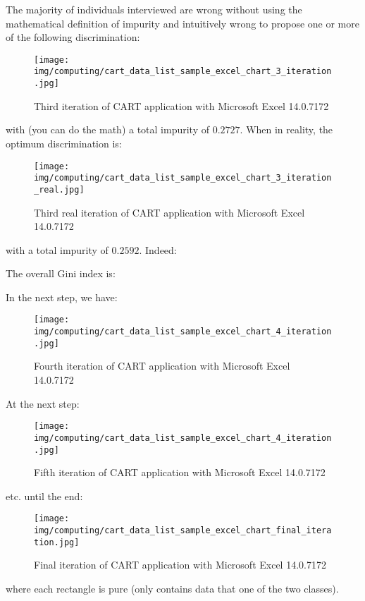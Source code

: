 	The majority of individuals interviewed are wrong without using the mathematical definition of impurity and intuitively wrong to propose one or more of the following discrimination:
	\begin{figure}[H]
		\centering
		\texttt{[image: img/computing/cart\_data\_list\_sample\_excel\_chart\_3\_iteration.jpg]}
		\caption[]{Third iteration of CART application with Microsoft Excel 14.0.7172}
	\end{figure}
	with (you can do the math) a total impurity of $0.2727$. When in reality, the optimum discrimination is:
	\begin{figure}[H]
		\centering
		\texttt{[image: img/computing/cart\_data\_list\_sample\_excel\_chart\_3\_iteration\_real.jpg]}
		\caption[]{Third real iteration of CART application with Microsoft Excel 14.0.7172}
	\end{figure}
	with a total impurity of $0.2592$. Indeed:
	
	The overall Gini index is:
	
	In the next step, we have:
	\begin{figure}[H]
		\centering
		\texttt{[image: img/computing/cart\_data\_list\_sample\_excel\_chart\_4\_iteration.jpg]}
		\caption[]{Fourth iteration of CART application with Microsoft Excel 14.0.7172}
	\end{figure}
	At the next step:
	\begin{figure}[H]
		\centering
		\texttt{[image: img/computing/cart\_data\_list\_sample\_excel\_chart\_4\_iteration.jpg]}
		\caption[]{Fifth iteration of CART application with Microsoft Excel 14.0.7172}
	\end{figure}
	etc. until the end:
	\begin{figure}[H]
		\centering
		\texttt{[image: img/computing/cart\_data\_list\_sample\_excel\_chart\_final\_iteration.jpg]}
		\caption[]{Final iteration of CART application with Microsoft Excel 14.0.7172}
	\end{figure}
	where each rectangle is pure (only contains data that one of the two classes).

